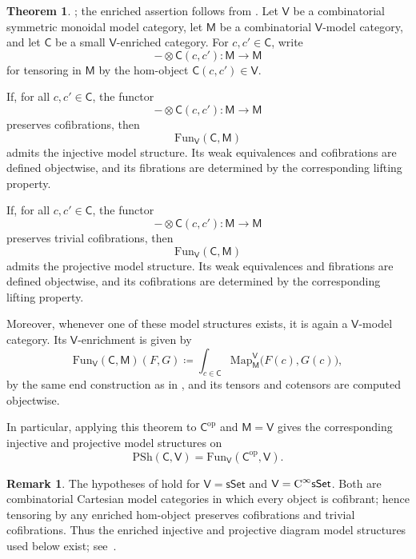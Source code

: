 \documentclass{amsart}
\newcommand{\cat}[1]{\mathsf{#1}}
\newcommand{\sset}{\cat{sSet}}
\newcommand{\CsSet}{\textnormal{C}^{\infty}\sset}
\newcommand{\Fun}{\mathrm{Fun}}
\newcommand{\Map}{\mathrm{Map}}
\newcommand{\psh}{\mathrm{PSh}}
\theoremstyle{definition}
\newtheorem{theorem}[equation]{Theorem}
\newtheorem{remark}[equation]{Remark}
\numberwithin{equation}{subsection}
\numberwithin{subsubsection}{subsection}
\begin{document}
\begin{theorem}\label{thm:enriched.injective.projective.model.structures}
  \textnormal{\cite[Theorem~4.4]{Mos18}; the enriched assertion follows from
  \cite[Theorem~5.4]{Mos18}.}
  Let \(\cat{V}\) be a combinatorial symmetric monoidal model category, let
  \(\cat{M}\) be a combinatorial \(\cat{V}\)-model category, and let
  \(\cat{C}\) be a small \(\cat{V}\)-enriched category. For \(c,c'\in\cat{C}\),
  write
  \[
    -\otimes \cat{C}(c,c'):\cat{M}\longrightarrow \cat{M}
  \]
  for tensoring in \(\cat{M}\) by the hom-object
  \(\cat{C}(c,c')\in\cat{V}\).

  If, for all \(c,c'\in\cat{C}\), the functor
  \[
    -\otimes \cat{C}(c,c'):\cat{M}\longrightarrow \cat{M}
  \]
  preserves cofibrations, then
  \[
    \Fun_{\cat{V}}(\cat{C},\cat{M})
  \]
  admits the injective model structure. Its weak equivalences and cofibrations
  are defined objectwise, and its fibrations are determined by the corresponding
  lifting property.

  If, for all \(c,c'\in\cat{C}\), the functor
  \[
    -\otimes \cat{C}(c,c'):\cat{M}\longrightarrow \cat{M}
  \]
  preserves trivial cofibrations, then
  \[
    \Fun_{\cat{V}}(\cat{C},\cat{M})
  \]
  admits the projective model structure. Its weak equivalences and fibrations
  are defined objectwise, and its cofibrations are determined by the
  corresponding lifting property.

  Moreover, whenever one of these model structures exists, it is again a
  \(\cat{V}\)-model category. Its \(\cat{V}\)-enrichment is given by
  \[
    \Fun_{\cat{V}}(\cat{C},\cat{M})(F,G)
    \coloneqq
    \int_{c\in\cat{C}}
    \Map_{\cat{M}}^{\cat{V}}\bigl(F(c),G(c)\bigr),
  \]
  by the same end construction as in
  , and its tensors and cotensors are
  computed objectwise.

  In particular, applying this theorem to \(\cat{C}^{\mathrm{op}}\) and
  \(\cat{M}=\cat{V}\) gives the corresponding injective and projective model
  structures on
  \[
    \psh(\cat{C},\cat{V})
    =
    \Fun_{\cat{V}}(\cat{C}^{\mathrm{op}},\cat{V}).
  \]
\end{theorem}

\begin{remark}
  The hypotheses of
   hold for
  \(\cat{V}=\sset\) and \(\cat{V}=\CsSet\). Both are combinatorial Cartesian
  model categories in which every object is cofibrant; hence tensoring by any
  enriched hom-object preserves cofibrations and trivial cofibrations. Thus
  the enriched injective and projective diagram model structures used below
  exist; see~\cite[Remark~5.5]{Mos18}.
\end{remark}
\end{document}
